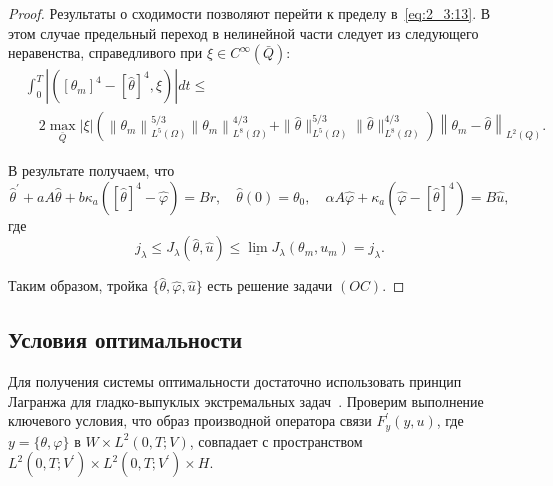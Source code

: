 \begin{proof}
    Результаты о сходимости позволяют перейти к пределу в~\eqref{eq:2_3:13}.
    В этом случае предельный переход в
    нелинейной части следует из следующего неравенства,
    справедливого при $\xi \in C^{\infty}(\bar{Q})$:
    \[
        \begin{aligned}
            & \int_{0}^{T}\left|\left(\left[\theta_{m}\right]^{4}
            -[\widehat{\theta}]^{4}, \xi\right)\right| d t \leq \\
            & \quad 2 \max _{\bar{Q}}|\xi|
            \left(\left\|\theta_{m}\right\|_{L^{5}(\Omega)}^{5 / 3}\left\|
            \theta_{m}\right\|_{L^{8}(\Omega)}^{4 / 3}
            + \|\widehat{\theta}\|_{L^{5}(\Omega)}^{5 / 3}
            \|\widehat{\theta}\|_{L^{8}(\Omega)}^{4 / 3}\right)\left\|\theta_{m}
            - \widehat{\theta}\right\|_{L^{2}(Q)}.
        \end{aligned}
    \]


    В результате получаем, что
    \[
        \widehat{\theta}^{\prime}+a A \widehat{\theta}+b
        \kappa_{a}\left([\widehat{\theta}]^{4}-\widehat{\varphi}\right)=B r,
        \quad \widehat{\theta}(0)=\theta_{0},
        \quad \alpha A \widehat{\varphi}+\kappa_{a}\left(\widehat{\varphi}-
        [\widehat{\theta}]^{4}\right)=B \widehat{u},
    \]
    где
    \[
        j_{\lambda} \leq J_{\lambda}(\widehat{\theta},
        \widehat{u}) \leq \underline{\lim }
        J_{\lambda}\left(\theta_{m}, u_{m}\right)=j_{\lambda}.
    \]

    Таким образом, тройка $\{\widehat{\theta}, \widehat{\varphi}, \widehat{u}\}$
    есть решение задачи $(OC)$.
\end{proof}

\subsection{Условия оптимальности}\label{subsec:ch2/sec3/subsec4}
Для получения системы оптимальности достаточно использовать принцип Лагранжа
для гладко-выпуклых экстремальных задач~\cite{10, 11}.
Проверим выполнение ключевого условия,
что образ производной оператора связи $F_{y}^{\prime}(y, u)$,
где $y=\{\theta, \varphi\} \text{ в }  W \times L^{2}(0, T ; V)$,
совпадает с пространством
$L^{2}\left(0, T; V^{\prime}\right) \times L^{2} \left(0, T ; V^{\prime}\right) \times H$.

